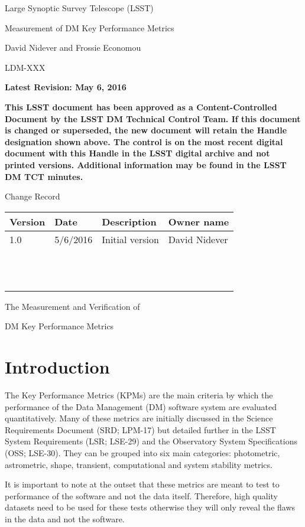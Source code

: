 Large Synoptic Survey Telescope (LSST)

Measurement of DM Key Performance Metrics

David Nidever and Frossie Economou

LDM-XXX

\textbf{Latest Revision: May 6, 2016}

\textbf{This LSST document has been approved as a Content-Controlled
Document by the LSST DM Technical Control Team. If this document is
changed or superseded, the new document will retain the Handle
designation shown above. The control is on the most recent digital
document with this Handle in the LSST digital archive and not printed
versions. Additional information may be found in the LSST DM TCT
minutes.}

\protect\hypertarget{_Toc368841914}{}{\protect\hypertarget{_Toc368842694}{}{\protect\hypertarget{_Toc324154303}{}{}}}Change
Record

\begin{longtable}[]{@{}llll@{}}
\toprule
\textbf{Version} & \textbf{Date} & \textbf{Description} & \textbf{Owner
name}\tabularnewline
\midrule
\endhead
1.0 & 5/6/2016 & Initial version & David Nidever\tabularnewline
& & &\tabularnewline
& & &\tabularnewline
& & &\tabularnewline
& & &\tabularnewline
& & &\tabularnewline
& & &\tabularnewline
& & &\tabularnewline
& & &\tabularnewline
& & &\tabularnewline
& & &\tabularnewline
& & &\tabularnewline
& & &\tabularnewline
\bottomrule
\end{longtable}

The Measurement and Verification of

DM Key Performance Metrics

\section{Introduction}\label{introduction}

The Key Performance Metrics (KPMs) are the main criteria by which the
performance of the Data Management (DM) software system are evaluated
quantitatively. Many of these metrics are initially discussed in the
Science Requirements Document (SRD; LPM-17) but detailed further in the
LSST System Requirements (LSR; LSE-29) and the Observatory System
Specifications (OSS; LSE-30). They can be grouped into six main
categories: photometric, astrometric, shape, transient, computational
and system stability metrics.

It is important to note at the outset that these metrics are meant to
test to performance of the software and not the data itself. Therefore,
high quality datasets need to be used for these tests otherwise they
will only reveal the flaws in the data and not the software.


